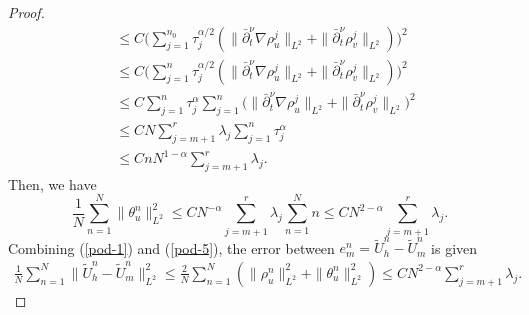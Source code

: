 \documentclass[11pt]{article}
\numberwithin{equation}{section}
\begin{document}
\begin{proof}
\begin{align*}
&\leq C\bigg(\sum_{j=1}^{n_0}\tau_j^{\alpha/2}(\|\bar\partial_t^\nu \nabla \rho_u^j\|_{L^2}+\|\bar\partial_t^\nu \rho_v^j\|_{L^2})\bigg)^2\\
&\leq C\bigg(\sum_{j=1}^{n}\tau_j^{\alpha/2}(\|\bar\partial_t^\nu \nabla \rho_u^j\|_{L^2}+\|\bar\partial_t^\nu \rho_v^j\|_{L^2})\bigg)^2\\
&\leq C\sum_{j=1}^{n}\tau_j^{\alpha}\sum_{j=1}^{n}\bigg(\|\bar\partial_t^\nu \nabla \rho_u^j\|_{L^2}+\|\bar\partial_t^\nu \rho_v^j\|_{L^2}\bigg)^2\\
&\leq CN\sum_{j=m+1}^r\lambda_j\sum_{j=1}^{n}\tau_j^{\alpha}\\
&\leq CnN^{1-\alpha}\sum_{j=m+1}^r\lambda_j.
\end{align*}
Then, we have
\begin{equation}\label{pod-5}
\frac{1}{N}\sum_{n=1}^N\|\theta_u^n\|_{L^2}^2
\leq  CN^{-\alpha}\sum_{j=m+1}^r\lambda_j\sum_{n=1}^Nn
\leq  CN^{2-\alpha}\sum_{j=m+1}^r\lambda_j.  
\end{equation}
Combining (\ref{pod-1}) and (\ref{pod-5}), the error between $e_m^n=\widetilde{U}_h^n-\widetilde{U}_m^n$ is given
\begin{align*}
\frac{1}{N}\sum_{n=1}^N\|\widetilde{U}_h^n-\widetilde{U}_m^n\|_{L^2}^2\leq  \frac{2}{N}\sum_{n=1}^N(\|\rho_u^n\|_{L^2}^2+\|\theta_u^n\|_{L^2}^2)\leq CN^{2-\alpha}\sum_{j=m+1}^r\lambda_j.    
\end{align*}
\end{proof}
\end{document}

